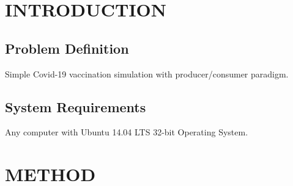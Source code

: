 \documentclass[12pt]{article}
\begin{document}
\vspace{\baselineskip}

\vspace{\baselineskip}

\vspace{\baselineskip}

\vspace{\baselineskip}

\vspace{\baselineskip}

\vspace{\baselineskip}

\vspace{\baselineskip}

\vspace{\baselineskip}

\vspace{\baselineskip}

\vspace{\baselineskip}

\vspace{\baselineskip}

\vspace{\baselineskip}

\vspace{\baselineskip}

\vspace{\baselineskip}

\vspace{\baselineskip}
\section{INTRODUCTION}
\subsection{Problem Definition }
\begin{justify}
Simple Covid-19 vaccination simulation with producer/consumer paradigm.
\end{justify}
\subsection{System Requirements}

\vspace{\baselineskip}
\begin{justify}
Any computer with Ubuntu 14.04 LTS 32-bit Operating System.
\end{justify}
\section{METHOD}
\end{document}
